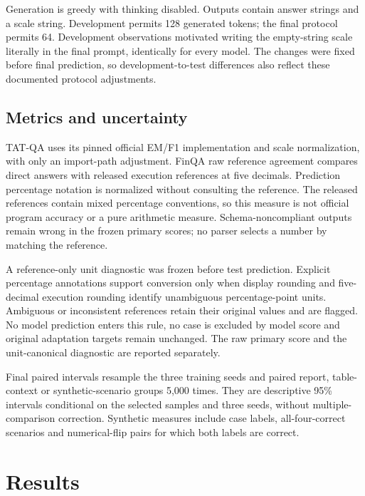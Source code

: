 \documentclass[11pt,a4paper]{article}
\begin{document}
Generation is greedy with thinking disabled. Outputs contain answer strings and a scale string. Development permits 128 generated tokens; the final protocol permits 64. Development observations motivated writing the empty-string scale literally in the final prompt, identically for every model. The changes were fixed before final prediction, so development-to-test differences also reflect these documented protocol adjustments.

\subsection{Metrics and uncertainty}
TAT-QA uses its pinned official EM/F1 implementation and scale normalization, with only an import-path adjustment. FinQA raw reference agreement compares direct answers with released execution references at five decimals. Prediction percentage notation is normalized without consulting the reference. The released references contain mixed percentage conventions, so this measure is not official program accuracy or a pure arithmetic measure. Schema-noncompliant outputs remain wrong in the frozen primary scores; no parser selects a number by matching the reference.

A reference-only unit diagnostic was frozen before test prediction. Explicit percentage annotations support conversion only when display rounding and five-decimal execution rounding identify unambiguous percentage-point units. Ambiguous or inconsistent references retain their original values and are flagged. No model prediction enters this rule, no case is excluded by model score and original adaptation targets remain unchanged. The raw primary score and the unit-canonical diagnostic are reported separately.

Final paired intervals resample the three training seeds and paired report, table-context or synthetic-scenario groups 5,000 times. They are descriptive 95\% intervals conditional on the selected samples and three seeds, without multiple-comparison correction. Synthetic measures include case labels, all-four-correct scenarios and numerical-flip pairs for which both labels are correct.

\section{Results}
\end{document}
